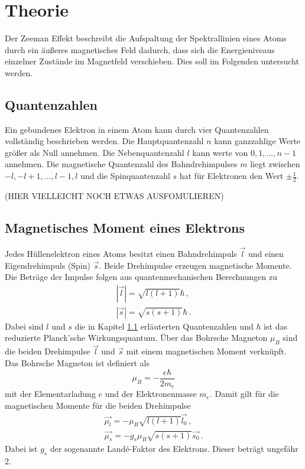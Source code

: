 \section{Theorie}
\label{sec:Theorie}
Der Zeeman Effekt beschreibt die Aufspaltung der Spektrallinien eines Atoms
durch ein äußeres magnetisches Feld dadurch, dass sich die Energieniveaus einzelner
Zustände im Magnetfeld verschieben. Dies soll im Folgenden untersucht werden.

\subsection{Quantenzahlen}
\label{subsec:quanten}

Ein gebundenes Elektron in einem Atom kann durch vier Quantenzahlen vollständig beschrieben werden.
Die Hauptquantenzahl $n$ kann ganzzahlige Werte größer als Null annehmen. Die Nebenquantenzahl
$l$ kann werte von $0,1,...,n-1$ annehmen. Die magnetische Quantenzahl des Bahndrehimpulses
$m$ liegt zwischen $-l, -l+1,..., l-1, l$ und die Spinquantenzahl $s$ hat für
Elektronen den Wert $\pm\frac{1}{2}$.

(HIER VIELLEICHT NOCH ETWAS AUSFOMULIEREN)

\subsection{Magnetisches Moment eines Elektrons}
Jedes Hüllenelektron eines Atoms besitzt einen Bahndrehimpuls $\vec{l}$ und einen
Eigendrehimpuls (Spin) $\vec{s}$. Beide Drehimpulse erzeugen magnetische Momente.
Die Beträge der Impulse folgen aus quantenmechanischen Berechnungen zu
\begin{align}
  |\vec{l}| = \sqrt{l(l+1)} \hbar  \,, \\
  |\vec{s}| = \sqrt{s(s+1)} \hbar \,.
\end{align}
Dabei sind $l$ und $s$ die in Kapitel \ref{subsec:quanten} erläuterten Quantenzahlen und
$\hbar$ ist das reduzierte Planck'sche Wirkungsquantum.
Über das Bohrsche Magneton $\mu_B$
sind die beiden Drehimpulse $\vec{l}$ und $\vec{s}$ mit einem magnetischen Moment
verknüpft. Das Bohrsche Magneton ist definiert als
\begin{equation}
  \mu_B = -\frac{e \hbar}{2 m_e}
\end{equation}
mit der Elementarladung $e$ und der Elektronenmasse $m_e$.
Damit gilt für die magnetischen Momente für die beiden Drehimpulse
\begin{align}
  \vec{\mu_l} = -\mu_B \sqrt{l(l+1)} \vec{l_0} \,, \\
  \vec{\mu_s} = -g_s \mu_B \sqrt{s(s+1)} \vec{s_0} \,.
\end{align}
Dabei ist $g_s$ der sogenannte Landé-Faktor des Elektrons. Dieser beträgt ungefähr 2.

